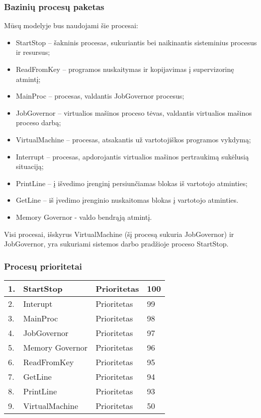\subsubsection{Bazinių procesų paketas}
Mūsų modelyje bus naudojami šie procesai:
	\begin{itemize}
		\item StartStop – šakninis procesas, sukuriantis bei naikinantis sisteminius procesus ir resursus;
		\item ReadFromKey – programos nuskaitymas ir kopijavimas į supervizorinę atmintį;
		\item MainProc – procesas, valdantis JobGovernor procesus;
		\item JobGovernor – virtualios mašinos proceso tėvas, valdantis virtualios mašinos proceso darbą;
		\item VirtualMachine – procesas, atsakantis už vartotojiškos programos vykdymą;
		\item Interrupt – procesas, apdorojantis virtualios mašinos pertraukimą sukėlusią situaciją;
		\item PrintLine – į išvedimo įrenginį persiunčiamas blokas iš vartotojo atminties;
		\item GetLine – iš įvedimo įrenginio nuskaitomas blokas į vartotojo atminties.
		\item Memory Governor - valdo bendrąją atmintį.
	\end{itemize}
Visi procesai, išskyrus VirtualMachine (šį procesą sukuria JobGovernor) ir JobGovernor, yra sukuriami sistemos darbo pradžioje proceso StartStop.

\subsubsection{Procesų prioritetai}

\begin{center}
    \begin{tabular}{ | l | l | l | l | }
    \hline
    1. & StartStop & Prioritetas & 100 \\ \hline
    2. & Interupt & Prioritetas & 99 \\ \hline
    3. & MainProc & Prioritetas & 98 \\ \hline
    4. & JobGovernor & Prioritetas & 97 \\ \hline
    5. &  Memory Governor & Prioritetas & 96 \\ \hline
    6. & ReadFromKey & Prioritetas & 95 \\ \hline
    7. & GetLine & Prioritetas & 94 \\ \hline
    8. & PrintLine & Prioritetas & 93 \\ \hline
    9. & VirtualMachine & Prioritetas & 50 \\ \hline
    \end{tabular}
\end{center}


